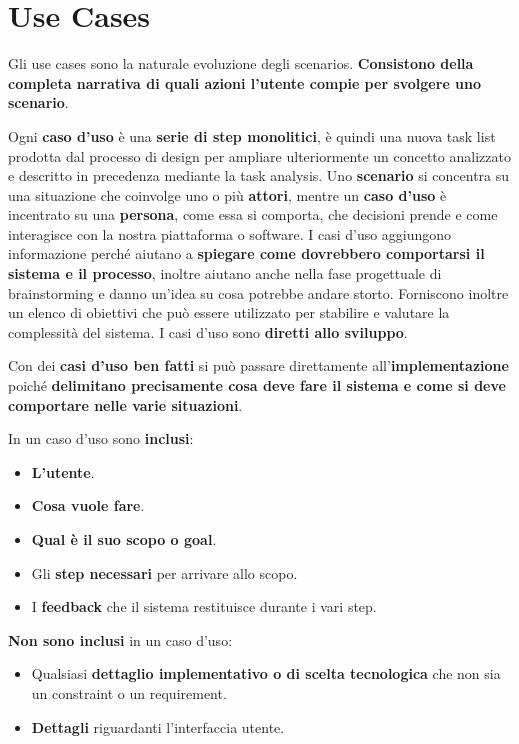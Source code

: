 \section{Use Cases}

Gli use cases sono la naturale evoluzione degli scenarios.
\textbf{Consistono della completa narrativa di quali azioni l'utente compie per svolgere uno scenario}.

Ogni \textbf{caso d'uso} è una \textbf{serie di step monolitici}, è quindi una nuova task list prodotta dal processo di design per ampliare ulteriormente un concetto analizzato e descritto in precedenza mediante la task analysis.
Uno \textbf{scenario} si concentra su una situazione che coinvolge uno o più \textbf{attori}, mentre un
\textbf{caso d'uso} è incentrato su una \textbf{persona}, come essa si comporta, che decisioni prende e come interagisce con la nostra piattaforma o software. I casi d'uso aggiungono informazione perché aiutano a \textbf{spiegare come dovrebbero comportarsi
	il sistema e il processo}, inoltre aiutano anche nella fase progettuale di brainstorming e danno un'idea su cosa potrebbe andare storto. Forniscono inoltre un elenco di obiettivi che può essere utilizzato per stabilire e valutare la complessità del sistema. I casi d'uso sono \textbf{diretti allo sviluppo}.

Con dei \textbf{casi d'uso ben fatti} si può passare direttamente all'\textbf{implementazione} poiché \textbf{delimitano precisamente cosa deve fare il sistema e come si deve comportare nelle varie situazioni}.

In un caso d'uso sono \textbf{inclusi}:

\begin{multicols}{2}
	\begin{itemize}
		\item \textbf{L'utente}.
		\item \textbf{Cosa vuole fare}.
		\item \textbf{Qual è il suo scopo o goal}.
		\item Gli \textbf{step necessari} per arrivare allo scopo.
		\item I \textbf{feedback} che il sistema restituisce durante i vari step.
	\end{itemize}
\end{multicols}

\textbf{Non sono inclusi} in un caso d'uso:

\begin{multicols}{2}
	\begin{itemize}
		\item Qualsiasi \textbf{dettaglio implementativo o di scelta tecnologica} che non sia un constraint o un requirement.
		\item \textbf{Dettagli} riguardanti l'interfaccia utente.
	\end{itemize}
\end{multicols}

